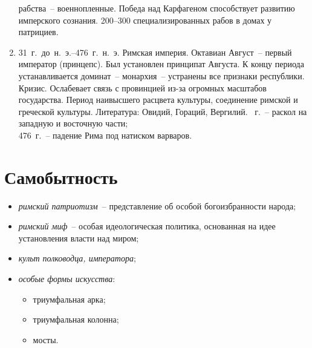 \begin{enumerate}
      рабства~-- военнопленные. Победа над Карфагеном способствует развитию
      имперского сознания. 200--300 специализированных рабов в домах у
      патрициев.
    \item 31~г.~до~н.~э.--476~г.~н.~э. Римская империя.
      \medskip
      Октавиан Август~-- первый император (принцепс). Был установлен принципат
      Августа. К концу периода устанавливается доминат~-- монархия~-- устранены
      все признаки республики. Кризис. Ослабевает связь с провинцией из-за
      огромных масштабов государства.
      \medskip
      Период наивысшего расцвета культуры, соединение римской и греческой
      культуры. Литература: Овидий, Гораций, Вергилий.
      ~г.~-- раскол на западную и восточную части; \\
      476~г.~-- падение Рима под натиском варваров.
  \end{enumerate}
  
\section{Самобытность}

  \begin{itemize}
    \item \emph{римский патриотизм}~-- представление об особой богоизбранности
      народа;
    \item \emph{римский миф}~-- особая идеологическая политика, основанная на
      идее установления власти над миром;
    \item \emph{культ полководца, императора};
    \item \emph{особые формы искусства}:
      \begin{itemize}
        \item триумфальная арка;
        \item триумфальная колонна;
        \item мосты.
      \end{itemize}
  \end{itemize}

